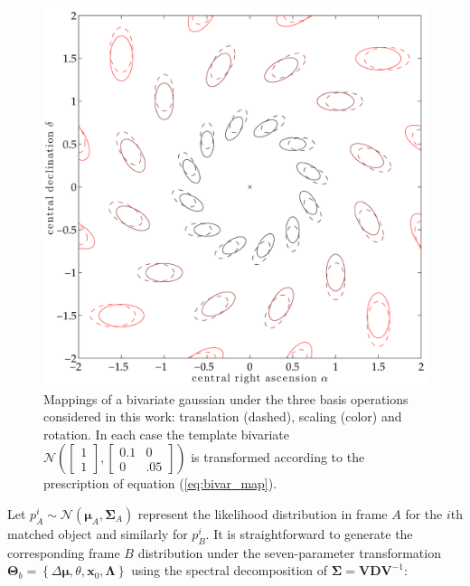\documentclass[manuscript]{aastex}
\newcommand{\N}{\mathcal{N}}
\newcommand{\bsmu}{\boldsymbol\mu}
\newcommand{\bsS}{\boldsymbol\Sigma}
\newcommand{\bsL}{\boldsymbol\Lambda}
\newcommand{\bsT}{\boldsymbol\Theta}
\begin{document}
\begin{figure}[htbp]
\centering
\includegraphics[width=\linewidth]{figures/gaussian_mappings.pdf}
\caption[Mappings of a bivariate gaussian under the three basis operations considered in this work: translation (dashed), scaling (color) and rotation.]{Mappings of a bivariate gaussian under the three basis operations considered in this work: translation (dashed), scaling (color) and rotation. In each case the template bivariate $\mathcal{N}\left(\left[
\begin{smallmatrix}
1 \\ 1
\end{smallmatrix}
\right],\left[ 
\begin{smallmatrix}
0.1 & 0 \\ 0 & .05
\end{smallmatrix}
\right]
\right)$ is transformed according to the prescription of equation (\ref{eq:bivar_map}).}\label{fig:gaussian_mappings}
\end{figure}
Let $p_A^i\sim\N(\bsmu_A,\bsS_A)$ represent the likelihood distribution in frame $A$ for the $i$th matched object and similarly for $p_B^i$. It is straightforward to generate the corresponding frame $B$ distribution under the seven-parameter transformation $\bsT_b = \left\{\Delta\bsmu, \theta, \mathbf{x}_0, \bsL\right\}$ using the spectral decomposition of $\bsS=\mathbf{V}\mathbf{D}\mathbf{V}^{-1}$:
\end{document}
